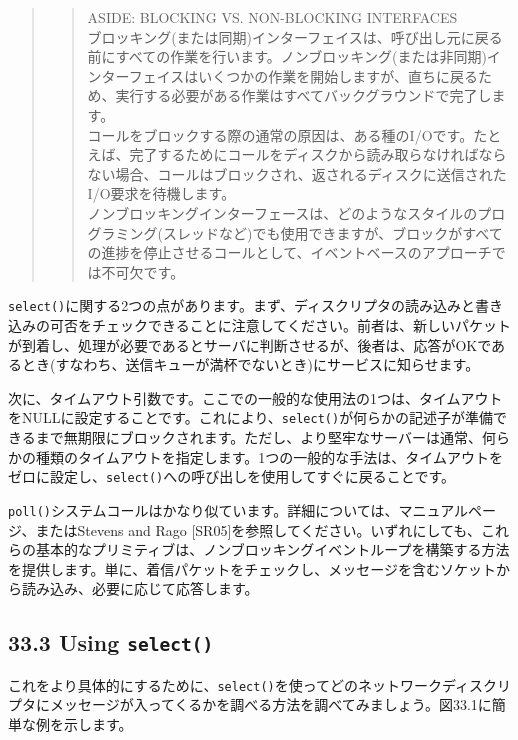 \begin{quote}
\begin{quote}
ASIDE: BLOCKING VS. NON-BLOCKING INTERFACES\\
ブロッキング(または同期)インターフェイスは、呼び出し元に戻る前にすべての作業を行います。ノンブロッキング(または非同期)インターフェイスはいくつかの作業を開始しますが、直ちに戻るため、実行する必要がある作業はすべてバックグラウンドで完了します。\\
コールをブロックする際の通常の原因は、ある種のI/Oです。たとえば、完了するためにコールをディスクから読み取らなければならない場合、コールはブロックされ、返されるディスクに送信されたI/O要求を待機します。\\
ノンブロッキングインターフェースは、どのようなスタイルのプログラミング(スレッドなど)でも使用できますが、ブロックがすべての進捗を停止させるコールとして、イベントベースのアプローチでは不可欠です。
\end{quote}
\end{quote}

\texttt{select()}に関する2つの点があります。まず、ディスクリプタの読み込みと書き込みの可否をチェックできることに注意してください。前者は、新しいパケットが到着し、処理が必要であるとサーバに判断させるが、後者は、応答がOKであるとき(すなわち、送信キューが満杯でないとき)にサービスに知らせます。

次に、タイムアウト引数です。ここでの一般的な使用法の1つは、タイムアウトをNULLに設定することです。これにより、\texttt{select()}が何らかの記述子が準備できるまで無期限にブロックされます。ただし、より堅牢なサーバーは通常、何らかの種類のタイムアウトを指定します。1つの一般的な手法は、タイムアウトをゼロに設定し、\texttt{select()}への呼び出しを使用してすぐに戻ることです。

\texttt{poll()}システムコールはかなり似ています。詳細については、マニュアルページ、またはStevens
and Rago
{[}SR05{]}を参照してください。いずれにしても、これらの基本的なプリミティブは、ノンブロッキングイベントループを構築する方法を提供します。単に、着信パケットをチェックし、メッセージを含むソケットから読み込み、必要に応じて応答します。

\hypertarget{using-select}{%
\subsection*{\texorpdfstring{33.3 Using
\texttt{select()}}{33.3 Using select()}}\label{using-select}}

これをより具体的にするために、\texttt{select()}を使ってどのネットワークディスクリプタにメッセージが入ってくるかを調べる方法を調べてみましょう。図33.1に簡単な例を示します。

